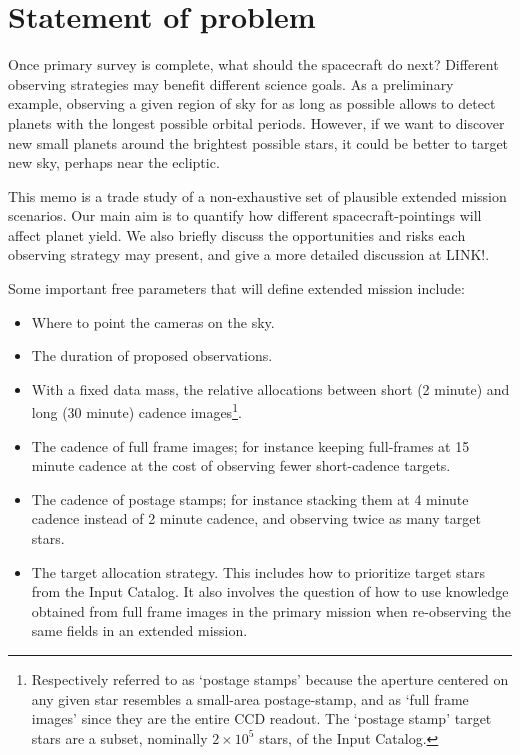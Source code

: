 \section{Statement of problem}
\label{sec:statement_of_problem}

Once \tesss primary survey is complete, what should the spacecraft do next? 
Different observing strategies may benefit different science goals. 
As a preliminary example, observing a given region of sky for as long as possible allows \tess to detect planets with the longest possible orbital periods.
However, if we want to discover new small planets around the brightest possible stars, it could be better to target new sky, perhaps near the ecliptic.


This memo is a trade study of a non-exhaustive set of plausible extended mission scenarios. 
Our main aim is to quantify how different spacecraft-pointings will affect \tesss planet yield.
We also briefly discuss the opportunities and risks each observing strategy may present, and give a more detailed discussion at LINK!.

Some important free parameters that will define \tesss extended mission include:
\begin{itemize}
	\item Where to point the cameras on the sky.
	\item The duration of proposed observations.
	\item With a fixed data mass, the relative allocations between short (2 minute) and long (30 minute) cadence images\footnote{Respectively referred to as `postage stamps' because the aperture centered on any given star resembles a small-area postage-stamp, and as `full frame images' since they are the entire CCD readout. The `postage stamp' target stars are a subset, nominally $2\times 10^5$ stars, of the \tess Input Catalog.}. 
	\item The cadence of full frame images; for instance keeping full-frames at 15 minute cadence at the cost of observing fewer short-cadence targets.
	\item The cadence of postage stamps; for instance stacking them at 4 minute cadence instead of 2 minute cadence, and observing twice as many target stars.
	\item The target allocation strategy. This includes how to prioritize target stars from the \tess Input Catalog. It also involves the question of how to use knowledge obtained from full frame images in the primary mission when re-observing the same fields in an extended mission.
\end{itemize}

